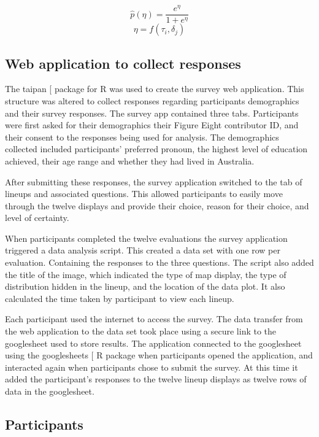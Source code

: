 \documentclass[
]{article}
\begin{document}
\[\widehat{p}(\eta) = \frac{e^{\eta}}{1 + e^{\eta}}\]
\label{eq:transform} \[\eta = f(\tau_i,\delta_j)\]

\subsection{Web application to collect
responses}\label{web-application-to-collect-responses}

The taipan {[}\citeproc{ref-taipan}{20}{]} package for R was used to
create the survey web application. This structure was altered to collect
responses regarding participants demographics and their survey
responses. The survey app contained three tabs. Participants were first
asked for their demographics their Figure Eight contributor ID, and
their consent to the responses being used for analysis. The demographics
collected included participants' preferred pronoun, the highest level of
education achieved, their age range and whether they had lived in
Australia.

After submitting these responses, the survey application switched to the
tab of lineups and associated questions. This allowed participants to
easily move through the twelve displays and provide their choice, reason
for their choice, and level of certainty.

When participants completed the twelve evaluations the survey
application triggered a data analysis script. This created a data set
with one row per evaluation. Containing the responses to the three
questions. The script also added the title of the image, which indicated
the type of map display, the type of distribution hidden in the lineup,
and the location of the data plot. It also calculated the time taken by
participant to view each lineup.

Each participant used the internet to access the survey. The data
transfer from the web application to the data set took place using a
secure link to the googlesheet used to store results. The application
connected to the googlesheet using the googlesheets
{[}\citeproc{ref-sheets}{21}{]} R package when participants opened the
application, and interacted again when participants chose to submit the
survey. At this time it added the participant's responses to the twelve
lineup displays as twelve rows of data in the googlesheet.

\subsection{Participants}\label{participants}
\end{document}
